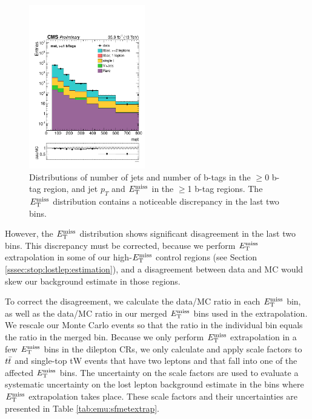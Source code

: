 \begin{figure}[htbp]
\includegraphics[width=0.45\textwidth]{figures/emuRegion_met.pdf}
\caption{Distributions of number of jets and number of b-tags in the
  $\geq$0 b-tag region, and jet $p_T$ and $E_\text{T}^\text{miss}$ in the $\geq$1 b-tag
  regions. The $E_\text{T}^\text{miss}$ distribution contains a noticeable discrepancy in
  the last two bins.}
\label{fig:emu:kinematics}
\end{figure}

However, the $E_\text{T}^\text{miss}$ distribution
shows significant disagreement in the last two bins. This discrepancy
must be corrected, because we perform $E_\text{T}^\text{miss}$ extrapolation in some of
our high-$E_\text{T}^\text{miss}$ control regions (see Section
\ref{sssec:stop:lostlep:estimation}), and a disagreement between data
and MC would skew our background estimate in those regions.

To correct the disagreement, we calculate the data/MC ratio in each
$E_\text{T}^\text{miss}$ bin, as well as the data/MC ratio in our merged $E_\text{T}^\text{miss}$ bins
used in the extrapolation. We rescale our Monte Carlo
events so that the ratio in the individual bin equals the ratio in the
merged bin. Because we only perform $E_\text{T}^\text{miss}$ extrapolation in a few
$E_\text{T}^\text{miss}$ bins in the dilepton CRs, we only calculate and apply scale
factors to $t\bar{t}$ and single-top tW events that have two leptons and
that fall into one of the affected $E_\text{T}^\text{miss}$ bins. The uncertainty on the
scale factors are used to evaluate a systematic uncertainty on the
lost lepton background estimate in the bins where $E_\text{T}^\text{miss}$ extrapolation
takes place. These scale factors and their uncertainties are presented
in Table \ref{tab:emu:sfmetextrap}.

